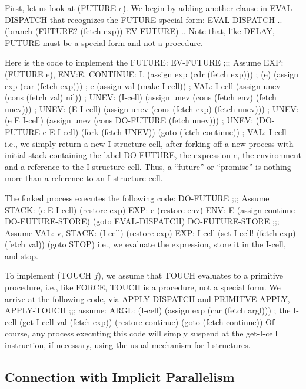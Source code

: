 First, let us look at {\cf (FUTURE $e$)}.  We begin by adding another clause
in {\cf EVAL-DISPATCH} that recognizes the {\cf FUTURE} special form:
\beginlisp
EVAL-DISPATCH
  ..
  (branch (FUTURE? (fetch exp)) EV-FUTURE)
  ..
\endlisp
Note that, like {\cf DELAY}, {\cf FUTURE} must be a special form and not a
procedure.

Here is the code to implement the {\cf FUTURE}:
\beginlisp
EV-FUTURE
  ;;; Assume EXP: (FUTURE e), ENV:E, CONTINUE: L
  (assign exp (cdr (fetch exp)))   ;  (e)
  (assign exp (car (fetch exp)))   ;  e
  (assign val (make-I-cell))       ;  VAL: I-cell
\null
  (assign unev (cons (fetch val) nil))           ; UNEV: (I-cell)
  (assign unev (cons (fetch env) (fetch unev)))  ; UNEV: (E I-cell)
  (assign unev (cons (fetch exp) (fetch unev)))  ; UNEV: (e E I-cell)
  (assign unev (cons DO-FUTURE (fetch unev)))    ; UNEV: (DO-FUTURE e E I-cell)
  (fork (fetch UNEV))
\null
  (goto (fetch continue))          ; VAL: I-cell
\endlisp
i.e., we simply return a new I-structure cell, after forking off a new
process with initial stack containing the label {\cf DO-FUTURE}, the
expression $e$, the environment and a reference to the I-structure cell.
Thus, a ``future'' or ``promise'' is nothing more than a reference to an
I-structure cell. 

The forked process executes the following code:
\beginlisp
DO-FUTURE
  ;;; Assume STACK: (e E I-cell)
  (restore exp)                         EXP: e
  (restore env)                         ENV: E
  (assign continue DO-FUTURE-STORE)
  (goto EVAL-DISPATCH)
\null
DO-FUTURE-STORE
  ;;; Assume VAL: v, STACK: (I-cell)
  (restore exp)                                EXP: I-cell
  (set-I-cell! (fetch exp) (fetch val))
  (goto STOP)
\endlisp
i.e., we evaluate the expression, store it in the I-cell, and stop.

To implement {\cf (TOUCH $f$)}, we assume that {\cf TOUCH} evaluates to a
primitive procedure, i.e., like {\cf FORCE}, {\cf TOUCH} is a procedure, not a
special form.  We arrive at the following code, via {\cf APPLY-DISPATCH} and
{\cf PRIMITVE-APPLY},
\beginlisp
APPLY-TOUCH
  ;;; assume: ARGL: (I-cell)
  (assign exp (car (fetch argl)))    ; the I-cell
  (get-I-cell val (fetch exp))
  (restore continue)
  (goto (fetch continue))
\endlisp
Of course, any process executing this code will simply suspend at the {\cf
get-I-cell} instruction, if necessary, using the usual mechanism for
I-structures.

\subsection{Connection with Implicit Parallelism}

